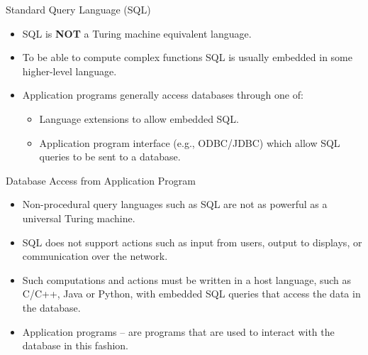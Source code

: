 \documentclass[aspectratio=169]{beamer}
\begin{document}

\begin{frame}{Standard Query Language (SQL)}
    \begin{itemize}
        \item SQL is \textbf{NOT} a Turing machine equivalent language.
        \item To be able to compute complex functions SQL is usually embedded in some higher-level language.
        \item Application programs generally access databases through one of:
        \begin{itemize}
            \item Language extensions to allow embedded SQL.
            \item Application program interface (e.g., ODBC/JDBC) which allow SQL queries to be sent to a database.
        \end{itemize}
    \end{itemize}
\end{frame}

\begin{frame}{Database Access from Application Program}
    \begin{itemize}
        \item Non-procedural query languages such as SQL are not as powerful as a universal Turing machine.    
        \item SQL does not support actions such as input from users, output to displays, or communication over the network.  
        \item Such computations and actions must be written in a host language, such as C/C++, Java or Python, with embedded SQL queries that access the data in the database.
        \item Application programs -- are programs that are used to interact with the database in this fashion.
    \end{itemize}
\end{frame}
\end{document}
